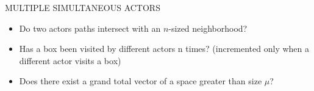 \documentclass{article}
\begin{document}
MULTIPLE SIMULTANEOUS ACTORS\\
\begin{itemize}
  \item Do two actors paths intersect with an $n$-sized neighborhood?
  \item Has a box been visited by different actors n times? (incremented only when a different actor visits a box)
  \item Does there exist a grand total vector of a space greater than size $\mu$?
\end{itemize}

\end{document}
